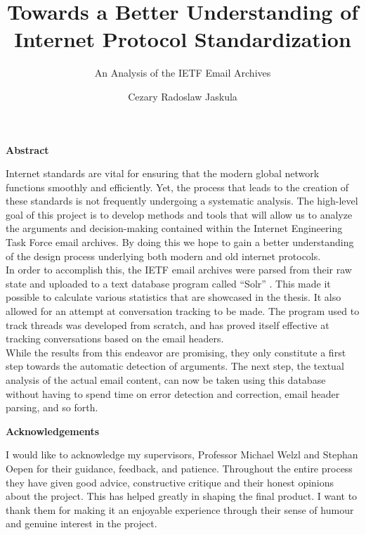 \documentclass[a4paper,english]{report}
\title{Towards a Better Understanding of Internet
Protocol Standardization}
\subtitle{An Analysis of the IETF Email Archives}
\author{Cezary Radoslaw Jaskula}
\begin{document}
\duoforside[dept={Institutt for informatikk},
program={Informatikk: Programmering og Systemarkitektur},
long]




\begin{centering}

\textbf{Abstract}

\end{centering}

\bigskip

Internet standards are vital for ensuring that the modern global network functions smoothly and efficiently. Yet, the process that leads to the creation of these standards is not frequently undergoing a systematic analysis. The high-level goal of this project is to develop methods and tools that will allow us to analyze the arguments and decision-making contained within the Internet Engineering Task Force email archives. By doing this we hope to gain a better understanding of the design process underlying both modern and old internet protocols.\\

In order to accomplish this, the IETF email archives were parsed from their raw state and uploaded to a text database program called “Solr” . This made it possible to calculate various statistics that are showcased in the thesis. It also allowed for an attempt at conversation tracking to be made. The program used to track threads was developed from scratch, and has proved itself effective at tracking conversations based on the email headers.\\

While the results from this endeavor are promising, they only constitute a first step towards the automatic detection of arguments. The next step, the textual analysis of the actual email content, can now be taken using this database without having to spend time on error detection and correction, email header parsing, and so forth.





\newpage

\newpage

\begin{centering}

\textbf{Acknowledgements}

\end{centering}

\bigskip



I would like to acknowledge my supervisors, Professor Michael Welzl and Stephan Oepen for their guidance, feedback, and patience. Throughout the entire process they have given good advice, constructive critique and their honest opinions about the project. This has helped greatly in shaping the final product. I want to thank them for making it an enjoyable experience through their sense of humour and genuine interest in the project.\\
\end{document}
